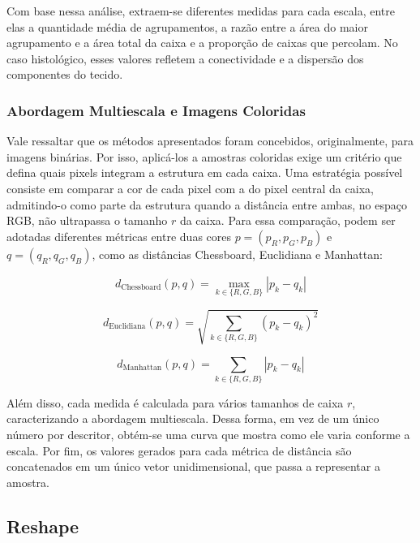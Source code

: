 Com base nessa análise, extraem-se diferentes medidas para cada escala, entre elas a quantidade média de agrupamentos, a razão entre a área do maior agrupamento e a área total da caixa e a proporção de caixas que percolam. No caso histológico, esses valores refletem a conectividade e a dispersão dos componentes do tecido.

\subsubsection{Abordagem Multiescala e Imagens Coloridas}
\hspace{+15pt}

Vale ressaltar que os métodos apresentados foram concebidos, originalmente, para imagens binárias. Por isso, aplicá-los a amostras coloridas exige um critério que defina quais pixels integram a estrutura em cada caixa. Uma estratégia possível consiste em comparar a cor de cada pixel com a do pixel central da caixa, admitindo-o como parte da estrutura quando a distância entre ambas, no espaço RGB, não ultrapassa o tamanho $r$ da caixa. %
Para essa comparação, podem ser adotadas diferentes métricas entre duas cores $p = (p_R, p_G, p_B)$ e $q = (q_R, q_G, q_B)$, como as distâncias Chessboard, Euclidiana e Manhattan:

\begin{equation}
d_{\text{Chessboard}}(p,q) = \max_{k \in \{R,G,B\}} |p_k - q_k|
\end{equation}

\begin{equation}
d_{\text{Euclidiana}}(p,q) = \sqrt{\sum_{k \in \{R,G,B\}} (p_k - q_k)^2}
\end{equation}

\begin{equation}
d_{\text{Manhattan}}(p,q) = \sum_{k \in \{R,G,B\}} |p_k - q_k|
\end{equation}

Além disso, cada medida é calculada para vários tamanhos de caixa $r$, caracterizando a abordagem multiescala. Dessa forma, em vez de um único número por descritor, obtém-se uma curva que mostra como ele varia conforme a escala. Por fim, os valores gerados para cada métrica de distância são concatenados em um único vetor unidimensional, que passa a representar a amostra.

\subsection{Reshape}
\hspace{+15pt}

